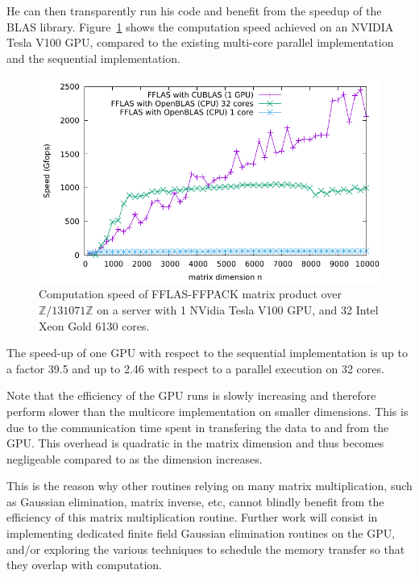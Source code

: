He can then transparently run his code and benefit from the speedup of the BLAS library. Figure~\ref{fig:fgemm_gpu}
shows the computation speed achieved on an NVIDIA Tesla V100 GPU, compared to the existing multi-core parallel
implementation and the sequential implementation.

\begin{figure}[htb]
\begin{center}
  \includegraphics[width=.9\textwidth]{Pictures/fgemm_GPUvsCPU}
\end{center}
\caption{Computation speed of FFLAS-FFPACK matrix product over $\mathbb{Z}/131071\mathbb{Z}$ on a server with 1 NVidia  Tesla V100 GPU, and 32 Intel Xeon Gold 6130 cores.}\label{fig:fgemm_gpu}
\end{figure}
The speed-up of one GPU with respect to the sequential implementation is up to a factor 39.5 and up to 2.46 with respect
to a parallel execution on 32 cores.

Note that the efficiency of the GPU runs is slowly increasing and therefore perform slower than the multicore
implementation on smaller dimensions. This is due to the communication  time spent in transfering the data to and from
the GPU. This overhead is quadratic in the matrix dimension and thus becomes negligeable compared to as the dimension
increases.

This is the reason why other routines relying on many matrix multiplication, such as Gaussian elimination, matrix
inverse, etc, cannot blindly benefit from the efficiency of this matrix multiplication routine. Further work will
consist in implementing dedicated finite field Gaussian elimination routines on the GPU, and/or exploring the various
techniques to schedule the memory transfer so that they overlap with computation.





